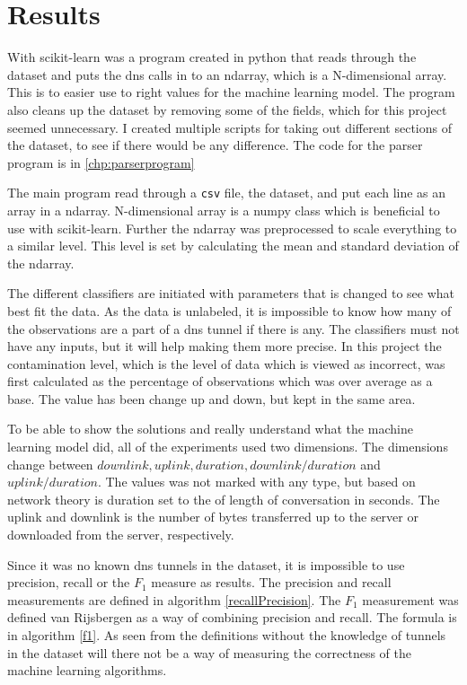 \chapter{Results}
\label{chp:results}



With scikit-learn was a program created in python that reads through the dataset and puts the \gls{dns} calls in to an ndarray, which is a N-dimensional array. This is to easier use to right values for the machine learning model. The program also cleans up the dataset by removing some of the fields, which for this project seemed unnecessary. I created multiple scripts for taking out different sections of the dataset, to see if there would be any difference. The code for the parser program is in \ref{chp:parserprogram}

The main program read through a \texttt{csv} file, the dataset, and put each line as an array in a ndarray. N-dimensional array is a numpy class which is beneficial to use with scikit-learn. Further the ndarray was preprocessed to scale everything to a similar level. This level is set by calculating the mean and standard deviation of the ndarray. 

The different classifiers are initiated with parameters that is changed to see what best fit the data. As the data is unlabeled, it is impossible to know how many of the observations are a part of a \gls{dns} tunnel if there is any. The classifiers must not have any inputs, but it will help making them more precise. In this project the contamination level, which is the level of data which is viewed as incorrect, was first calculated as the percentage of observations which was over average as a base. The value has been change up and down, but kept in the same area. 

To be able to show the solutions and really understand what the machine learning model did, all of the experiments used two dimensions. The dimensions change between $downlink, uplink, duration, downlink/duration$ and $uplink/duration$. The values was not marked with any type, but based on network theory is duration set to the of length of conversation in seconds. The uplink and downlink is  the number of bytes transferred up to the server or downloaded from the server, respectively.

Since it was no known \gls{dns} tunnels in the dataset, it is impossible to use precision, recall or the $F_1$ measure as results. The precision and recall measurements are defined in algorithm \ref{recallPrecision}. The $F_1$ measurement was defined van Rijsbergen \cite{manevitz2002one} as a way of combining precision and recall. The formula is in algorithm \ref{f1}. As seen from the definitions without the knowledge of tunnels in the dataset will there not be a way of measuring the correctness of the machine learning algorithms.

